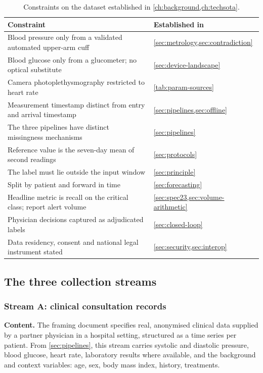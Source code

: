 \documentclass[12pt,a4paper,oneside]{report}
\begin{document}
\begin{table}[htbp]
\centering\footnotesize
\caption{Constraints on the dataset established in \cref{ch:background,ch:techsota}.}\label{tab:carried-constraints}
\begin{tabularx}{\textwidth}{@{}X >{\raggedright\arraybackslash}p{4.4cm}@{}}
\toprule
\textbf{Constraint} & \textbf{Established in} \\
\midrule
Blood pressure only from a validated automated upper-arm cuff & \cref{sec:metrology,sec:contradiction} \\
Blood glucose only from a glucometer; no optical substitute & \cref{sec:device-landscape} \\
Camera photoplethysmography restricted to heart rate & \cref{tab:param-sources} \\
Measurement timestamp distinct from entry and arrival timestamp & \cref{sec:pipelines,sec:offline} \\
The three pipelines have distinct missingness mechanisms & \cref{sec:pipelines} \\
Reference value is the seven-day mean of second readings & \cref{sec:protocols} \\
The label must lie outside the input window & \cref{sec:principle} \\
Split by patient and forward in time & \cref{sec:forecasting} \\
Headline metric is recall on the critical class; report alert volume & \cref{sec:spec23,sec:volume-arithmetic} \\
Physician decisions captured as adjudicated labels & \cref{sec:closed-loop} \\
Data residency, consent and national legal instrument stated & \cref{sec:security,sec:interop} \\
\bottomrule
\end{tabularx}
\end{table}

\subsection{The three collection streams}\label{sec:streams}

\subsubsection{Stream A: clinical consultation records}

\textbf{Content.} The framing document specifies real, anonymised clinical data supplied by a partner physician in a hospital setting, structured as a time series per patient. From \cref{sec:pipelines}, this stream carries systolic and diastolic pressure, blood glucose, heart rate, laboratory results where available, and the background and context variables: age, sex, body mass index, history, treatments.
\end{document}
